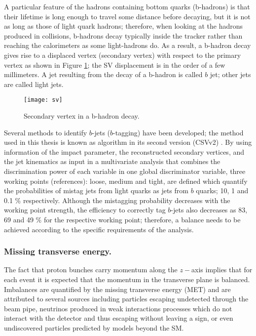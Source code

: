 A particular feature of the hadrons containing bottom quarks (b-hadrons) is that their lifetime is long enough to travel some distance before decaying, but it is not as long as those of light quark hadrons; therefore, when looking at the hadrons produced in \pp collisions, b-hadrons decay typically inside the tracker rather than reaching the calorimeters as some light-hadrons do. As a result, a b-hadron decay gives rise to a displaced vertex (secondary vertex) with respect to the primary vertex as shown in Figure \ref{fig:sv}; the SV displacement is in the order of a few millimeters. A jet resulting from the decay of a b-hadron is called $b$ jet; other jets are called light jets. 

\begin{figure}[!h]
  \centering
  \texttt{[image: sv]}
  \caption[Secondary vertex in a b-hadron decay.]{Secondary vertex in a b-hadron decay.}\label{fig:sv}
\end{figure}

Several methods to identify $b$-jets ($b$-tagging) have been developed; the method used in this thesis is known as  algorithm in its second version (CSVv2) \cite{btag}. By using information of the impact parameter, the reconstructed secondary vertices, and the jet kinematics as input in a multivariate analysis that combines the discrimination power of each variable in one global discriminator variable, three working points (references): loose, medium and tight, are defined which quantify the probabilities of mistag jets from light quarks as jets from $b$ quarks; 10, 1 and 0.1 \% respectively. Although the mistagging probability decreases with the working point strength, the efficiency to correctly tag $b$-jets also decreases as 83, 69 and 49 \% for the respective working point; therefore, a balance needs to be achieved according to the specific requirements of the analysis.

\subsubsection*{Missing transverse energy.}\label{sssec:met}

The fact that proton bunches carry momentum along the $z-$axis implies that for each event it is expected that the momentum in the transverse plane is balanced. Imbalances are quantified by the missing transverse energy (MET) and are attributed to several sources including particles escaping undetected through the beam pipe, neutrinos produced in weak interactions processes which do not interact with the detector and thus escaping without leaving a sign, or even undiscovered particles predicted by models beyond the SM.

